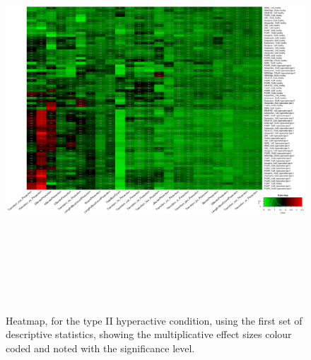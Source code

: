 \documentclass[a4paper,12pt]{article}
\begin{document}
\begin{figure}[h!]
\begin{center}
\includegraphics[width=16cm,height=15cm]{DarkPTZ_heatmap_all_DarkPTZ_B2MAP.png}
\caption{Heatmap, for the type II hyperactive condition, using the first set of descriptive statistics, showing the multiplicative effect sizes colour coded and noted with the significance level.}
\end{center}
\end{figure}
\newpage
\end{document}
